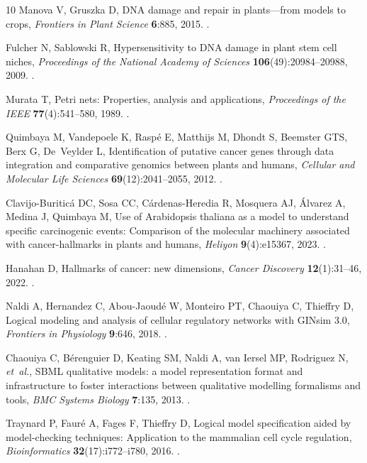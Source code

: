 \documentclass{ws-jbcb}
\numberwithin{equation}{section}
\begin{document}
\begin{thebibliography}{10}
Manova V, Gruszka D, {DNA} damage and repair in plants---from models to crops,
  \emph{Frontiers in Plant Science} \textbf{6}:885, 2015.
\newblock {}.

Fulcher N, Sablowski R, Hypersensitivity to {DNA} damage in plant stem cell
  niches, \emph{Proceedings of the National Academy of Sciences}
  \textbf{106}(49):20984--20988, 2009.
\newblock {}.

Murata T, Petri nets: Properties, analysis and applications, \emph{Proceedings
  of the IEEE} \textbf{77}(4):541--580, 1989.
\newblock {}.

Quimbaya M, Vandepoele K, Rasp{\'e} E, Matthijs M, Dhondt S, Beemster GTS, Berx
  G, De~Veylder L, Identification of putative cancer genes through data
  integration and comparative genomics between plants and humans,
  \emph{Cellular and Molecular Life Sciences} \textbf{69}(12):2041--2055, 2012.
\newblock {}.

Clavijo-Buritic\'a DC, Sosa CC, C\'ardenas-Heredia R, Mosquera AJ, \'Alvarez A,
  Medina J, Quimbaya M, Use of {Arabidopsis thaliana} as a model to understand
  specific carcinogenic events: Comparison of the molecular machinery
  associated with cancer-hallmarks in plants and humans, \emph{Heliyon}
  \textbf{9}(4):e15367, 2023.
\newblock {}.

Hanahan D, Hallmarks of cancer: new dimensions, \emph{Cancer Discovery}
  \textbf{12}(1):31--46, 2022.
\newblock {}.

Naldi A, Hernandez C, Abou-Jaoud\'e W, Monteiro PT, Chaouiya C, Thieffry D,
  Logical modeling and analysis of cellular regulatory networks with {GINsim}
  3.0, \emph{Frontiers in Physiology} \textbf{9}:646, 2018.
\newblock {}.

Chaouiya C, B\'erenguier D, Keating SM, Naldi A, van Iersel MP, Rodriguez N,
  \emph{et~al.}, {SBML} qualitative models: a model representation format and
  infrastructure to foster interactions between qualitative modelling
  formalisms and tools, \emph{BMC Systems Biology} \textbf{7}:135, 2013.
\newblock {}.

Traynard P, Faur\'e A, Fages F, Thieffry D, Logical model specification aided
  by model-checking techniques: Application to the mammalian cell cycle
  regulation, \emph{Bioinformatics} \textbf{32}(17):i772--i780, 2016.
\newblock {}.


\end{thebibliography}
\end{document}

